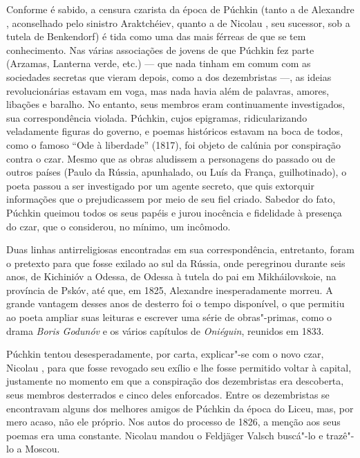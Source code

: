 Conforme é sabido, a censura czarista da época de Púchkin (tanto a de
Alexandre , aconselhado pelo sinistro Araktchéiev, quanto a de Nicolau , seu sucessor, sob a tutela de Benkendorf) é tida como uma das mais férreas de que se tem conhecimento. Nas várias associações de jovens de que Púchkin fez parte (Arzamas, Lanterna verde, etc.) --- que nada tinham em comum com as sociedades secretas que vieram depois, como a dos dezembristas ---, as ideias revolucionárias estavam em voga, mas nada havia além de palavras, amores, libações e baralho. No entanto, seus membros eram continuamente investigados, sua correspondência violada. Púchkin, cujos epigramas, ridicularizando veladamente figuras do governo, e poemas históricos estavam na boca de todos, como o famoso ``Ode à liberdade'' (1817), foi objeto de calúnia por conspiração contra o czar. Mesmo que as obras aludissem a
personagens do passado ou de outros países (Paulo  da Rússia,
apunhalado, ou Luís  da França, guilhotinado), o poeta passou a ser investigado por um agente secreto, que quis extorquir informações que o
prejudicassem por meio de seu fiel criado. Sabedor do fato, Púchkin queimou todos os seus papéis e jurou inocência e fidelidade à presença do czar, que o considerou, no mínimo, um incômodo.

Duas linhas antirreligiosas encontradas em sua correspondência,
entretanto, foram o pretexto para que fosse exilado ao sul da Rússia,
onde peregrinou durante seis anos, de Kichinióv a
Odessa, de Odessa à tutela do pai em Mikháilovskoie, na província de
Pskóv, até que, em 1825, Alexandre  inesperadamente morreu. A grande
vantagem desses anos de desterro foi o tempo disponível, o que permitiu ao
poeta ampliar suas leituras e escrever uma série de obras"-primas, como o
drama \emph{Boris Godunóv} e os vários capítulos de
\emph{Oniéguin}, reunidos em 1833.

Púchkin tentou desesperadamente, por carta, explicar"-se com o novo czar,
Nicolau , para que fosse revogado seu exílio e lhe fosse permitido
voltar à capital, justamente no momento em que a conspiração dos dezembristas era descoberta, seus membros desterrados e cinco deles enforcados. Entre os dezembristas se encontravam alguns dos melhores amigos de Púchkin da época do Liceu, mas, por mero acaso, não ele próprio. Nos autos do processo de 1826, a
menção aos seus poemas era uma constante. Nicolau mandou o Feldjäger Valsch buscá"-lo e trazê"-lo a Moscou.

